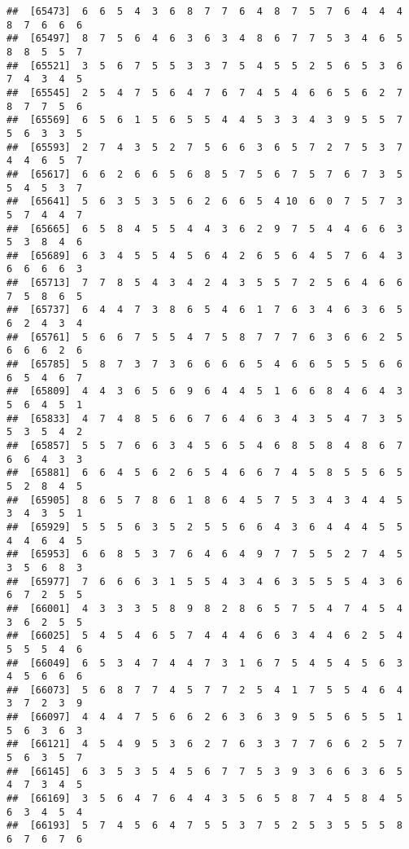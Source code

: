 \documentclass[
]{book}
\begin{document}
\begin{verbatim}
##  [65473]  6  6  5  4  3  6  8  7  7  6  4  8  7  5  7  6  4  4  4  8  7  6  6  6
##  [65497]  8  7  5  6  4  6  3  6  3  4  8  6  7  7  5  3  4  6  5  8  8  5  5  7
##  [65521]  3  5  6  7  5  5  3  3  7  5  4  5  5  2  5  6  5  3  6  7  4  3  4  5
##  [65545]  2  5  4  7  5  6  4  7  6  7  4  5  4  6  6  5  6  2  7  8  7  7  5  6
##  [65569]  6  5  6  1  5  6  5  5  4  4  5  3  3  4  3  9  5  5  7  5  6  3  3  5
##  [65593]  2  7  4  3  5  2  7  5  6  6  3  6  5  7  2  7  5  3  7  4  4  6  5  7
##  [65617]  6  6  2  6  6  5  6  8  5  7  5  6  7  5  7  6  7  3  5  5  4  5  3  7
##  [65641]  5  6  3  5  3  5  6  2  6  6  5  4 10  6  0  7  5  7  3  5  7  4  4  7
##  [65665]  6  5  8  4  5  5  4  4  3  6  2  9  7  5  4  4  6  6  3  5  3  8  4  6
##  [65689]  6  3  4  5  5  4  5  6  4  2  6  5  6  4  5  7  6  4  3  6  6  6  6  3
##  [65713]  7  7  8  5  4  3  4  2  4  3  5  5  7  2  5  6  4  6  6  7  5  8  6  5
##  [65737]  6  4  4  7  3  8  6  5  4  6  1  7  6  3  4  6  3  6  5  6  2  4  3  4
##  [65761]  5  6  6  7  5  5  4  7  5  8  7  7  7  6  3  6  6  2  5  6  6  6  2  6
##  [65785]  5  8  7  3  7  3  6  6  6  6  5  4  6  6  5  5  5  6  6  6  5  4  6  7
##  [65809]  4  4  3  6  5  6  9  6  4  4  5  1  6  6  8  4  6  4  3  5  6  4  5  1
##  [65833]  4  7  4  8  5  6  6  7  6  4  6  3  4  3  5  4  7  3  5  5  3  5  4  2
##  [65857]  5  5  7  6  6  3  4  5  6  5  4  6  8  5  8  4  8  6  7  6  6  4  3  3
##  [65881]  6  6  4  5  6  2  6  5  4  6  6  7  4  5  8  5  5  6  5  5  2  8  4  5
##  [65905]  8  6  5  7  8  6  1  8  6  4  5  7  5  3  4  3  4  4  5  3  4  3  5  1
##  [65929]  5  5  5  6  3  5  2  5  5  6  6  4  3  6  4  4  4  5  5  4  4  6  4  5
##  [65953]  6  6  8  5  3  7  6  4  6  4  9  7  7  5  5  2  7  4  5  3  5  6  8  3
##  [65977]  7  6  6  6  3  1  5  5  4  3  4  6  3  5  5  5  4  3  6  6  7  2  5  5
##  [66001]  4  3  3  3  5  8  9  8  2  8  6  5  7  5  4  7  4  5  4  3  6  2  5  5
##  [66025]  5  4  5  4  6  5  7  4  4  4  6  6  3  4  4  6  2  5  4  5  5  5  4  6
##  [66049]  6  5  3  4  7  4  4  7  3  1  6  7  5  4  5  4  5  6  3  4  5  6  6  6
##  [66073]  5  6  8  7  7  4  5  7  7  2  5  4  1  7  5  5  4  6  4  3  7  2  3  9
##  [66097]  4  4  4  7  5  6  6  2  6  3  6  3  9  5  5  6  5  5  1  5  6  3  6  3
##  [66121]  4  5  4  9  5  3  6  2  7  6  3  3  7  7  6  6  2  5  7  5  6  3  5  7
##  [66145]  6  3  5  3  5  4  5  6  7  7  5  3  9  3  6  6  3  6  5  4  7  3  4  5
##  [66169]  3  5  6  4  7  6  4  4  3  5  6  5  8  7  4  5  8  4  5  6  3  4  5  4
##  [66193]  5  7  4  5  6  4  7  5  5  3  7  5  2  5  3  5  5  5  8  6  7  6  7  6

\end{verbatim}
\end{document}
